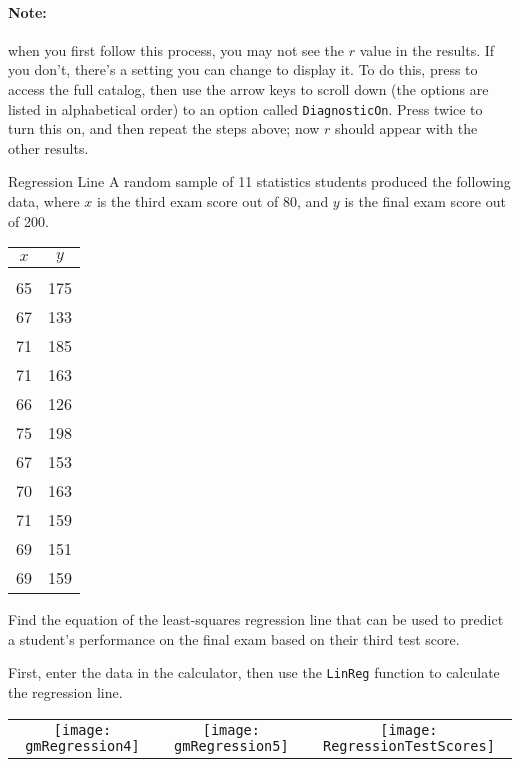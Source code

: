 \paragraph{Note:} when you first follow this process, you may not see the $r$ value in the results.  If you don't, there's a setting you can change to display it.  To do this, press   to access the full catalog, then use the arrow keys to scroll down (the options are listed in alphabetical order) to an option called \texttt{DiagnosticOn}.  Press  twice to turn this on, and then repeat the steps above; now $r$ should appear with the other results.
\pagebreak

\begin{example}[https://www.youtube.com/watch?v=kcSr2C6I_-A&list=PLfmpjsIzhzttL_Uec2nCbDRcAcUF7NKG8&index=20]{Regression Line}
A random sample of 11 statistics students produced the following data, where $x$ is the third exam score out of 80, and $y$ is the final exam score out of 200.
\begin{center}
\begin{tabular}{c c}
$x$ & $y$\\
\hline
\\
65 & 175\\
67 & 133\\
71 & 185\\
71 & 163\\
66 & 126\\
75 & 198\\
67 & 153\\
70 & 163\\
71 & 159\\
69 & 151\\
69 & 159
\end{tabular}
\end{center}

Find the equation of the least-squares regression line that can be used to predict a student's performance on the final exam based on their third test score.

\sol
First, enter the data in the calculator, then use the \texttt{LinReg} function to calculate the regression line.
\begin{center}
\begin{tabular}{c c c}
\texttt{[image: gmRegression4]}
& \texttt{[image: gmRegression5]}
& \texttt{[image: RegressionTestScores]}
\end{tabular}
\end{center}


\end{example}
